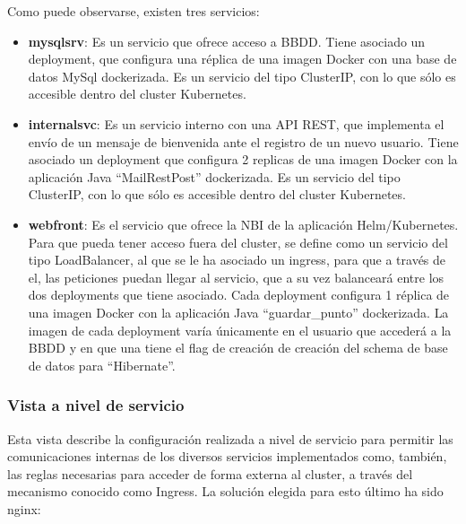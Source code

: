 \documentclass[12pt,spanish]{article}
\begin{document}
Como puede observarse, existen tres servicios:
\begin{itemize}
\item{\textbf{mysqlsrv}}: Es un servicio que ofrece acceso a BBDD. Tiene asociado un deployment, que configura una réplica de una imagen Docker con una base de datos MySql dockerizada. Es un servicio del tipo ClusterIP, con lo que sólo es accesible dentro del cluster Kubernetes.
\item{\textbf{internalsvc}}: Es un servicio interno con una API REST, que implementa el envío de un mensaje de bienvenida ante el registro de un nuevo usuario. Tiene asociado un deployment que configura 2 replicas de una imagen Docker con la aplicación Java “MailRestPost” dockerizada. Es un servicio del tipo ClusterIP, con lo que sólo es accesible dentro del cluster Kubernetes.
\item{\textbf{webfront}}: Es el servicio que ofrece la NBI de la aplicación Helm/Kubernetes. Para que pueda tener acceso fuera del cluster, se define como un servicio del tipo LoadBalancer, al que se le ha asociado un ingress, para que a través de el, las peticiones puedan llegar al servicio, que a su vez balanceará entre los dos deployments que tiene asociado. Cada deployment configura 1 réplica de una imagen Docker con la aplicación Java ``guardar\_punto'' dockerizada. La imagen de cada deployment varía únicamente en el usuario que accederá a la BBDD y en que una tiene el flag de creación de creación del schema de base de datos para ``Hibernate''.
\end{itemize}

\subsubsection{Vista a nivel de servicio}

Esta vista describe la configuración realizada a nivel de servicio para permitir las comunicaciones internas de los diversos servicios implementados como, también, las reglas necesarias para acceder de forma externa al cluster, a través del mecanismo conocido como Ingress. La solución elegida para esto último ha sido nginx:
\end{document}

